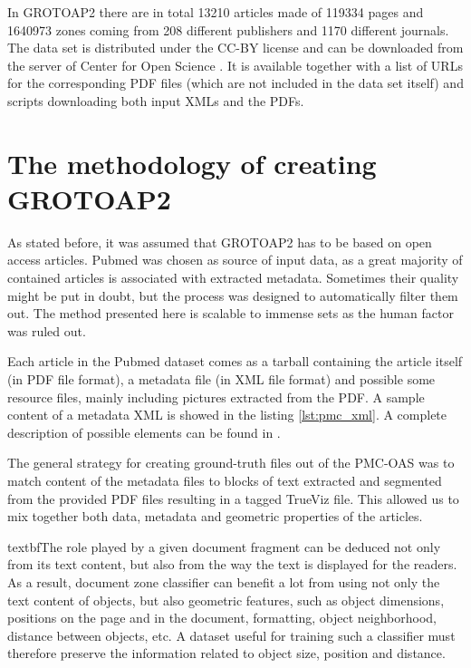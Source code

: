 In GROTOAP2 there are in total 13210 articles made of 119334 pages and 1640973 zones coming from 208 different publishers and 1170 different journals. The data set is distributed under the CC-BY license and can be downloaded from the server of Center for Open Science \cite{CeON}. It is available together with a list of URLs for the corresponding PDF files (which are not included in the data set itself) and scripts downloading both input XMLs and the PDFs.

\section{The methodology of creating GROTOAP2}
As stated before, it was assumed that GROTOAP2 has to be based on open access articles. Pubmed was chosen as source of input data, as a great majority of contained articles is associated with extracted metadata. Sometimes their quality might be put in doubt, but the process was designed to automatically filter them out. The method presented here is scalable to immense sets as the human factor was ruled out.

Each article in the Pubmed dataset comes as a tarball containing the article itself (in PDF file format), a metadata file (in XML file format) and possible some resource files, mainly including pictures extracted from the PDF. A sample content of a metadata XML is showed in the listing \ref{lst:pmc_xml}. A complete description of possible elements can be found in \cite{PubmedXML}.




The general strategy for creating ground-truth files out of the PMC-OAS was to match content of the metadata files to blocks of text extracted and segmented from the provided PDF files resulting in a tagged TrueViz file. This allowed us to mix together both data, metadata and geometric properties of the articles. \

textbf{The role played by a given document fragment can be deduced not only from its text content, but also from the way the text is displayed for the readers. As a result, document zone classifier can benefit a lot from using not only the text content of objects, but also geometric features, such as object dimensions, positions on the page and in the document, formatting, object neighborhood, distance between objects, etc. A dataset useful for training such a classifier must therefore preserve the information related to object size, position and distance.}

